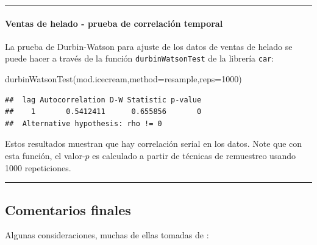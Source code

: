\documentclass[
]{article}
\newenvironment{Shaded}{\begin{snugshade}}{\end{snugshade}}
\newcommand{\AttributeTok}[1]{\textcolor[rgb]{0.77,0.63,0.00}{#1}}
\newcommand{\DecValTok}[1]{\textcolor[rgb]{0.00,0.00,0.81}{#1}}
\newcommand{\FunctionTok}[1]{\textcolor[rgb]{0.00,0.00,0.00}{#1}}
\newcommand{\NormalTok}[1]{#1}
\newcommand{\StringTok}[1]{\textcolor[rgb]{0.31,0.60,0.02}{#1}}
\begin{document}
\rule{\textwidth}{0.4pt}

\hypertarget{ventas-de-helado---prueba-de-correlaciuxf3n-temporal}{%
\paragraph*{Ventas de helado - prueba de correlación temporal}\label{ventas-de-helado---prueba-de-correlaciuxf3n-temporal}}

La prueba de Durbin-Watson para ajuste de los datos de ventas de helado se puede hacer a través de la función \texttt{durbinWatsonTest} de la librería \texttt{car}:

\begin{Shaded}
\begin{Highlighting}[]
\FunctionTok{durbinWatsonTest}\NormalTok{(mod.icecream,}\AttributeTok{method=}\StringTok{\textquotesingle{}resample\textquotesingle{}}\NormalTok{,}\AttributeTok{reps=}\DecValTok{1000}\NormalTok{)}
\end{Highlighting}
\end{Shaded}

\begin{verbatim}
##  lag Autocorrelation D-W Statistic p-value
##    1       0.5412411      0.655856       0
##  Alternative hypothesis: rho != 0
\end{verbatim}

Estos resultados muestran que hay correlación serial en los datos. Note que con esta función, el valor-\(p\) es calculado a partir de técnicas de remuestreo usando 1000 repeticiones.

\rule{\textwidth}{0.4pt}

\hypertarget{comentarios-finales}{%
\subsection{Comentarios finales}\label{comentarios-finales}}

Algunas consideraciones, muchas de ellas tomadas de \citet{behar_validacion_2002}:
\end{document}
